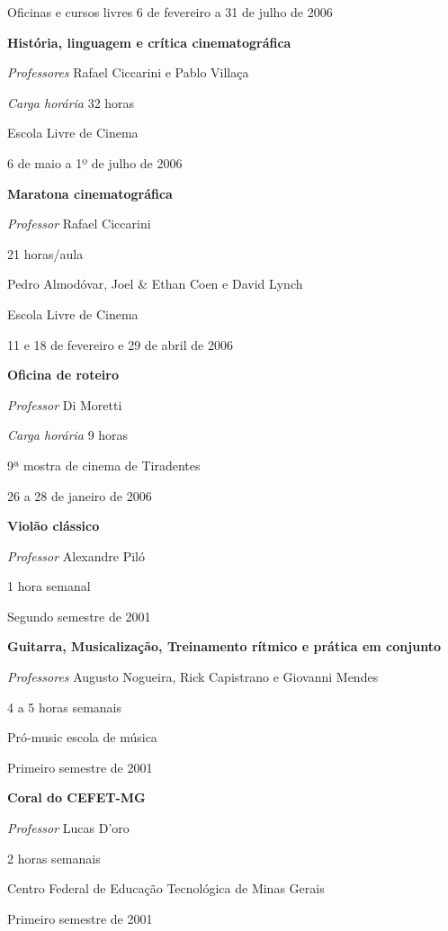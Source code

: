 \begin {rubric} {Oficinas e cursos livres}
6 de fevereiro a 31 de julho de 2006

\entry* [Crítica]
\textbf {História, linguagem e crítica cinematográfica}

\textit {Professores} Rafael Ciccarini e Pablo Villaça

\textit {Carga horária} 32 horas

Escola Livre de Cinema

6 de maio a 1º de julho de 2006

\entry* [Diretores]
\textbf {Maratona cinematográfica}

\textit {Professor} Rafael Ciccarini

21 horas/aula

Pedro Almodóvar, Joel \& Ethan Coen e David Lynch

Escola Livre de Cinema

11 e 18 de fevereiro e 29 de abril de 2006

\entry* [Roteiro]
\textbf {Oficina de roteiro}

\textit {Professor} Di Moretti

\textit {Carga horária} 9 horas

9ª mostra de cinema de Tiradentes

26 a 28 de janeiro de 2006


\entry* [Violão]
\textbf {Violão clássico}

\textit {Professor} Alexandre Piló

1 hora semanal

Segundo semestre de 2001

\entry* [Guitarra]
\textbf {Guitarra, Musicalização, Treinamento rítmico e prática em conjunto}

\textit {Professores} Augusto Nogueira, Rick Capistrano e Giovanni Mendes

4 a 5 horas semanais

Pró-music escola de música

Primeiro semestre de 2001

\entry* [Coral]
\textbf {Coral do CEFET-MG}

\textit {Professor} Lucas D’oro

2 horas semanais

Centro Federal de Educação Tecnológica de Minas Gerais

Primeiro semestre de 2001

\end{rubric}
